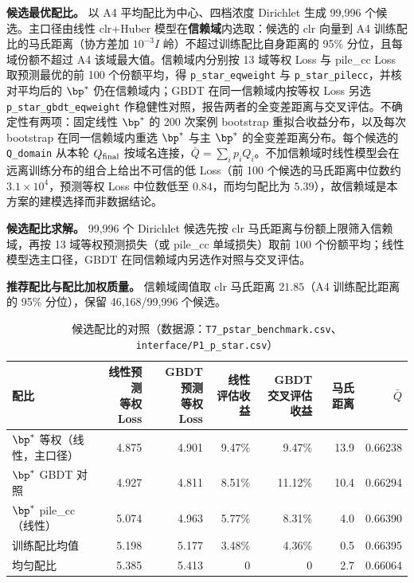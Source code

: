 \textbf{候选最优配比。} 以 A4 平均配比为中心、四档浓度 Dirichlet 生成 99,996 个候选。主口径由线性 clr+Huber 模型在\textbf{信赖域}内选取：候选的 clr 向量到 A4 训练配比的马氏距离（协方差加 $10^{-3}I$ 岭）不超过训练配比自身距离的 95\% 分位，且每域份额不超过 A4 该域最大值。信赖域内分别按 13 域等权 Loss 与 pile\_cc Loss 取预测最优的前 100 个份额平均，得 \texttt{p\_star\_eqweight} 与 \texttt{p\_star\_pilecc}，并核对平均后的 $\bp^*$ 仍在信赖域内；GBDT 在同一信赖域内按等权 Loss 另选 \texttt{p\_star\_gbdt\_eqweight} 作稳健性对照，报告两者的全变差距离与交叉评估。不确定性有两项：固定线性 $\bp^*$ 的 200 次案例 bootstrap 重拟合收益分布，以及每次 bootstrap 在同一信赖域内重选 $\bp^*$ 与主 $\bp^*$ 的全变差距离分布。每个候选的 \texttt{Q\_domain} 从本轮 $Q_{\rm final}$ 按域名连接，$\bar Q=\sum_ip_iQ_i$。不加信赖域时线性模型会在远离训练分布的组合上给出不可信的低 Loss（前 100 个候选的马氏距离中位数约 $3.1\times10^4$，预测等权 Loss 中位数低至 $0.84$，而均匀配比为 $5.39$），故信赖域是本方案的建模选择而非数据结论。

\textbf{候选配比求解。} 99,996 个 Dirichlet 候选先按 clr 马氏距离与份额上限筛入信赖域，再按 13 域等权预测损失（或 pile\_cc 单域损失）取前 100 个份额平均；线性模型选主口径，GBDT 在同信赖域内另选作对照与交叉评估。

\textbf{推荐配比与配比加权质量。} 信赖域阈值取 clr 马氏距离 $21.85$（A4 训练配比距离的 95\% 分位），保留 46,168/99,996 个候选。

\begin{table}[H]
\centering\footnotesize
\caption{候选配比的对照（数据源：\texttt{T7\_pstar\_benchmark.csv}、\texttt{interface/P1\_p\_star.csv}）}
\label{tab:q1pstar}
\begin{tabularx}{\textwidth}{@{}p{2.7cm} r r r r r r@{}}
\toprule
配比 & \makecell{线性预测\\等权 Loss} & \makecell{GBDT 预测\\等权 Loss} & \makecell{线性\\评估收益} & \makecell{GBDT\\交叉评估收益} & 马氏距离 & $\bar Q$ \\
\midrule
$\bp^*$ 等权（线性，主口径） & 4.875 & 4.901 & 9.47\% & 9.47\% & 13.9 & 0.66238 \\
$\bp^*$ GBDT 对照 & 4.927 & 4.811 & 8.51\% & 11.12\% & 10.4 & 0.66294 \\
$\bp^*$ pile\_cc（线性） & 5.074 & 4.963 & 5.77\% & 8.31\% & 4.0 & 0.66390 \\
训练配比均值 & 5.198 & 5.177 & 3.48\% & 4.36\% & 0.5 & 0.66395 \\
均匀配比 & 5.385 & 5.413 & 0 & 0 & 2.7 & 0.66064 \\
\bottomrule
\end{tabularx}
\end{table}

